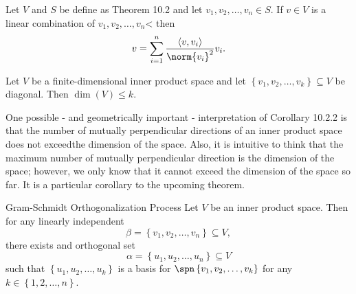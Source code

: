 \documentclass[linearalgebra]{subfiles}
\begin{document}
    \begin{cor}{}
        Let $V$ and $S$ be define as Theorem 10.2 and let $v_1,v_2,\ldots,v_n\in S$. If $v\in V$ is a linear combination of $v_1,v_2,\ldots,v_n$< then
        \begin{equation*}
            v = \sum^{n}_{i=1} \frac{\left\langle v, v_i\right\rangle }{\norm{v_i}^2} v_i.
        \end{equation*}
    \end{cor}	

    \begin{cor}{}
        Let $V$ be a finite-dimensional inner product space and let $\left\lbrace v_1,v_2,\ldots,v_k \right\rbrace \subseteq V$ be diagonal. Then $\dim(V) \leq k$.
    \end{cor}	

    \begin{remark}
        One possible - and geometrically important - interpretation of Corollary 10.2.2 is that the number of mutually perpendicular directions of an inner product space does not exceedthe dimension of the space. Also, it is intuitive to think that the maximum number of mutually perpendicular direction is the dimension of the space; however, we only know that it cannot exceed the dimension of the space so far. It is a particular corollary to the upcoming theorem.
    \end{remark}

    \clearpage
    \begin{theorem}{Gram-Schmidt Orthogonalization Process}
        Let $V$ be an inner product space. Then for any linearly independent
        \begin{equation*}
            \beta = \left\lbrace v_1,v_2,\ldots,v_n \right\rbrace \subseteq V,
        \end{equation*}
        there exists and orthogonal set
        \begin{equation*}
            \alpha = \left\lbrace u_1, u_2, \ldots, u_n \right\rbrace \subseteq V
        \end{equation*}
        such that $\left\lbrace u_1,u_2,\ldots,u_k \right\rbrace$ is a basis for $\spn\left\lbrace v_1,v_2,\ldots,v_k \right\rbrace$ for any $k\in\left\lbrace 1,2,\ldots,n \right\rbrace$.
    \end{theorem}
\end{document}
